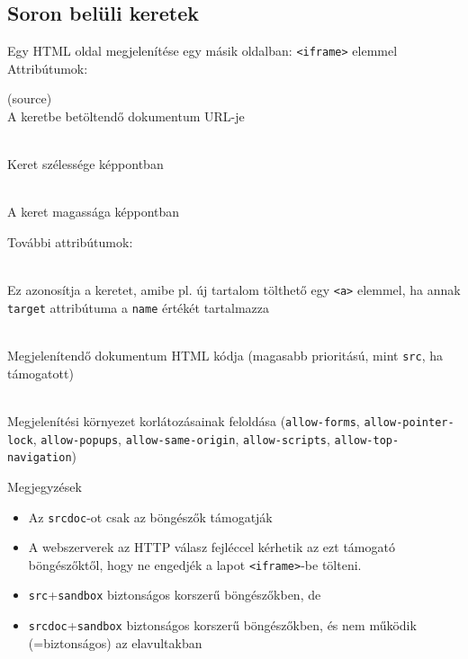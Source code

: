 \subsection{Soron belüli keretek}

\begin{frame}
  Egy HTML oldal megjelenítése egy másik oldalban: \texttt{<iframe>} elemmel
  \vfill
  Attribútumok:
  \begin{description}[m]
    \item[\texttt{src}] (source) \hfill \\ A keretbe betöltendő dokumentum URL-je
    \item[\texttt{width}] \hfill \\ Keret szélessége képpontban
    \item[\texttt{height}] \hfill \\ A keret magassága képpontban
  \end{description}
\end{frame}

\begin{frame}
  További attribútumok:
  \begin{description}[m]
    \item[\texttt{name}] \hfill \\ Ez azonosítja a keretet, amibe pl. új tartalom tölthető egy \texttt{<a>} elemmel, ha annak \texttt{target} attribútuma a \texttt{name} értékét tartalmazza
    \item[\texttt{srcdoc}] \hfill \\ Megjelenítendő dokumentum HTML kódja (magasabb prioritású, mint \texttt{src}, ha támogatott)
    \item[\texttt{sandbox}] \hfill \\ Megjelenítési környezet korlátozásainak feloldása (\texttt{allow-forms}, \texttt{allow-pointer-lock}, \texttt{allow-popups}, \texttt{allow-same-origin}, \texttt{allow-scripts}, \texttt{allow-top-navigation}) 
  \end{description}
\end{frame}

\begin{frame}
  Megjegyzések
  \begin{itemize}
    \item Az \texttt{srcdoc}-ot csak az  böngészők támogatják
    \item A webszerverek az  HTTP válasz fejléccel kérhetik az ezt támogató böngészőktől, hogy ne engedjék a lapot \texttt{<iframe>}-be tölteni.
    \item \texttt{src}+\texttt{sandbox} biztonságos korszerű böngészőkben, de 
    \item \texttt{srcdoc}+\texttt{sandbox} biztonságos korszerű böngészőkben, és nem működik (=biztonságos) az elavultakban
  \end{itemize}
\end{frame}

